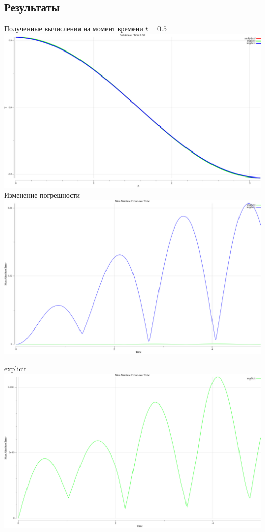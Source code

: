 \documentclass{article}
\begin{document}
\pagebreak
\subsection*{Результаты}
\begin{center}
Полученные вычисления на момент времени $ t = 0.5 $
\\
\includegraphics[scale=0.3]{solutions.png}
\\


Изменение погрешности
\\
\includegraphics[scale=0.3]{error_plot1.png}

\pagebreak
explicit
\\
\includegraphics[scale=0.3]{error_plot2.png}
\end{center}
\end{document}
